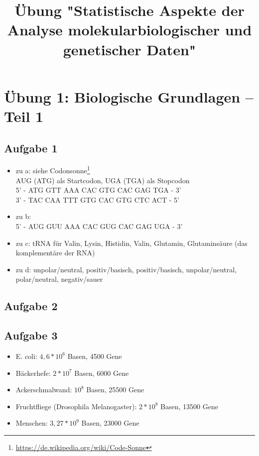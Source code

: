 \documentclass[13pt,a4paper]{article}
\title{Übung "Statistische Aspekte der Analyse molekularbiologischer und genetischer Daten"}
\author{}
\date{}
\begin{document}
\begin{titlepage}

\maketitle
\thispagestyle{empty}
\end{titlepage}
\newpage

\begin{titlepage}
\tableofcontents
\thispagestyle{empty}
\end{titlepage}
\newpage

\section{Übung 1: Biologische Grundlagen – Teil 1}

\subsection{Aufgabe 1}

\begin{itemize}
	\item zu a: siehe Codonsonne\footnote{\url{https://de.wikipedia.org/wiki/Code-Sonne}}\\
		AUG (ATG) als Startcodon, UGA (TGA) als Stopcodon\\
		5' - ATG GTT AAA CAC GTG CAC GAG TGA - 3'\\
		3' - TAC CAA TTT GTG CAC GTG CTC ACT - 5'
	\item zu b:\\
		5' - AUG GUU AAA CAC GUG CAC GAG UGA - 3'
	\item zu c: tRNA für Valin, Lysin, Histidin, Valin, Glutamin, Glutaminsäure (das komplementäre der RNA)
	\item zu d: unpolar/neutral, positiv/basisch, positiv/basisch, unpolar/neutral, polar/neutral, negativ/sauer
	
\end{itemize}

\subsection{Aufgabe 2}

\subsection{Aufgabe 3}

\begin{itemize}
	\item E. coli: $4,6*10^6$ Basen, 4500 Gene
	\item Bäckerhefe: $2*10^7$ Basen, 6000 Gene
	\item Ackerschmalwand: $10^8$ Basen, 25500 Gene
	\item Fruchtfliege (Drosophila Melanogaster): $2*10^8$ Basen, 13500 Gene
	\item Menschen: $3,27 * 10^9$ Basen, 23000 Gene
\end{itemize}
\end{document}
